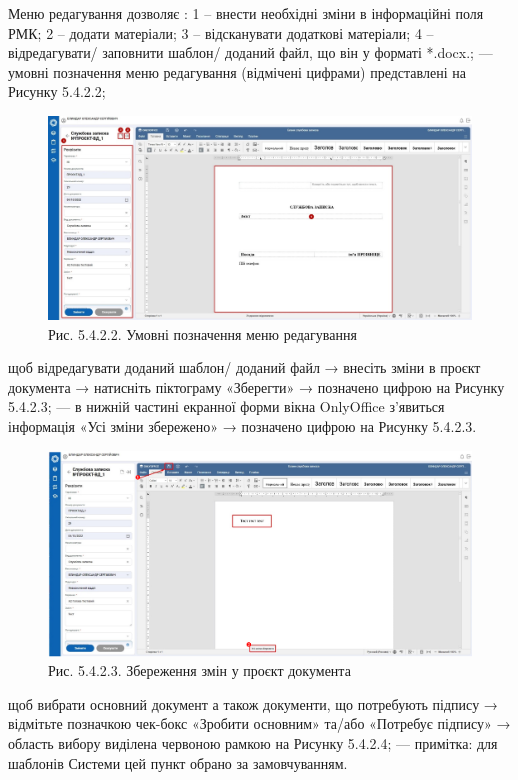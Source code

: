 Меню редагування дозволяє :
1 – внести необхідні зміни в інформаційні поля РМК;
2 – додати матеріали;
3 – відсканувати додаткові матеріали;
4 – відредагувати/ заповнити шаблон/ доданий файл, що він у форматі *.docx.;
--- умовні позначення меню редагування (відмічені цифрами) представлені на Рисунку 5.4.2.2;

\begin{figure}[!htbp]
\centerline{\includegraphics[width=\textwidth]{img/5.4.2.2.jpg}}
\caption{Рис. 5.4.2.2. Умовні позначення меню редагування}
\end{figure}

щоб відредагувати доданий шаблон/ доданий файл → внесіть зміни в проєкт
документа → натисніть піктограму «Зберегти» → позначено цифрою  на Рисунку 5.4.2.3;
--- в нижній частині екранної форми вікна OnlyOffice з'явиться інформація «Усі зміни збережено»
→ позначено цифрою  на Рисунку 5.4.2.3.

\begin{figure}[!htbp]
\centerline{\includegraphics[width=\textwidth]{img/5.4.2.3.png}}
\caption{Рис. 5.4.2.3. Збереження змін у проєкт документа}
\end{figure}

щоб вибрати основний документ а також документи, що потребують підпису
→ відмітьте позначкою чек-бокс «Зробити основним» та/або «Потребує
підпису» → область вибору виділена червоною рамкою на Рисунку 5.4.2.4;
--- примітка: для шаблонів Системи цей пункт обрано за замовчуванням.


